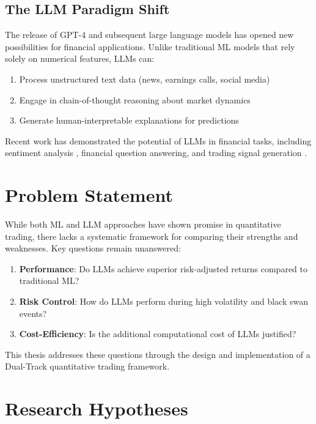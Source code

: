 \subsection{The LLM Paradigm Shift}

The release of GPT-4 and subsequent large language models has opened new possibilities for financial applications. Unlike traditional ML models that rely solely on numerical features, LLMs can:

\begin{enumerate}
    \item Process unstructured text data (news, earnings calls, social media)
    \item Engage in chain-of-thought reasoning about market dynamics
    \item Generate human-interpretable explanations for predictions
\end{enumerate}

Recent work has demonstrated the potential of LLMs in financial tasks, including sentiment analysis \cite{kirtac2024sentiment}, financial question answering, and trading signal generation \cite{yang2023fingpt}.

\section{Problem Statement}

While both ML and LLM approaches have shown promise in quantitative trading, there lacks a systematic framework for comparing their strengths and weaknesses. Key questions remain unanswered:

\begin{enumerate}
    \item \textbf{Performance}: Do LLMs achieve superior risk-adjusted returns compared to traditional ML?
    \item \textbf{Risk Control}: How do LLMs perform during high volatility and black swan events?
    \item \textbf{Cost-Efficiency}: Is the additional computational cost of LLMs justified?
\end{enumerate}

This thesis addresses these questions through the design and implementation of a Dual-Track quantitative trading framework.

\section{Research Hypotheses}

